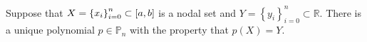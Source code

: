 \begin{frame}

	\begin{theorem}
		Suppose that
		\begin{math}
			X={\left\{x_{i}\right\}}_{i=0}^{n}\subset
			\left[a,b\right]
		\end{math}
		is a nodal set
		and
		\begin{math}
			Y=
			{\left\{
			y_{i}
			\right\}}_{i=0}^{n}\subset
			\mathbb{R}
		\end{math}.
		There is a unique polynomial $p\in\mathbb{P}_{n}$ with the
		property that $p\left(X\right)=Y$.
	\end{theorem}


\end{frame}
